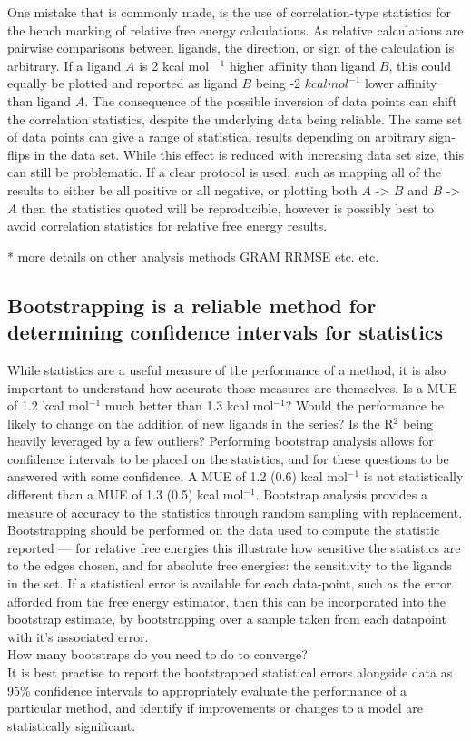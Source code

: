 \documentclass[9pt,bestpractices]{livecoms}
\begin{document}
One mistake that is commonly made, is the use of correlation-type statistics for the bench marking of relative free energy calculations. As relative calculations are pairwise comparisons between ligands, the direction, or sign of the calculation is arbitrary. If a ligand $A$ is 2 kcal mol $^{-1}$ higher affinity than ligand $B$, this could equally be plotted and reported as ligand $B$ being -2 $kcal mol ^{-1}$ lower affinity than ligand $A$. The consequence of the possible inversion of data points can shift the correlation statistics, despite the underlying data being reliable. The same set of data points can give a range of statistical results depending on arbitrary sign-flips in the data set. While this effect is reduced with increasing data set size, this can still be problematic. If a clear protocol is used, such as mapping all of the results to either be all positive or all negative, or plotting both $A$ -> $B$ and $B$ -> $A$ then the statistics quoted will be reproducible, however is possibly best to avoid correlation statistics for relative free energy results.



* more details on other analysis methods GRAM RRMSE etc. etc. 


\subsection{Bootstrapping is a reliable method for determining confidence intervals for statistics}

While statistics are a useful measure of the performance of a method, it is also important to understand how accurate those measures are themselves. Is a MUE of 1.2 kcal mol$^{-1}$ much better than 1.3 kcal mol$^{-1}$? Would the performance be likely to change on the addition of new ligands in the series? Is the R$^2$ being heavily leveraged by a few outliers? Performing bootstrap analysis allows for confidence intervals to be placed on the statistics, and for these questions to be answered with some confidence. A MUE of 1.2 (0.6) kcal mol$^{-1}$ is not statistically different than a MUE of 1.3 (0.5) kcal mol$^{-1}$. Bootstrap analysis provides a measure of accuracy to the statistics through random sampling with replacement. Bootstrapping should be performed on the data used to compute the statistic reported --- for relative free energies this illustrate how sensitive the statistics are to the edges chosen, and for absolute free energies: the sensitivity to the ligands in the set. If a statistical error is available for each data-point, such as the error afforded from the free energy estimator, then this can be incorporated into the bootstrap estimate, by bootstrapping over a sample taken from each datapoint with it's associated error.\\
How many bootstraps do you need to do to converge?\\
It is best practise to report the bootstrapped statistical errors alongside data as 95\% confidence intervals to appropriately evaluate the performance of a particular method, and identify if improvements or changes to a model are statistically significant.
\end{document}
